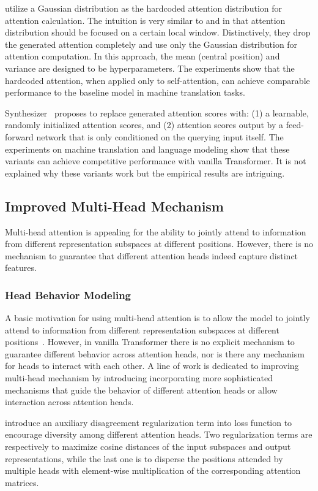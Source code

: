 \documentclass[manuscript,acmsmall,screen,nonacm]{acmart}
\theoremstyle{definition}
\begin{document}
\citet{you2020hardcoded} utilize a Gaussian distribution as the hardcoded attention distribution for attention calculation. The intuition is very similar to \citet{yang18localness} and \citet{guo19gaussian} in that attention distribution should be focused on a certain local window. Distinctively, they drop the generated attention completely and use only the Gaussian distribution for attention computation. In this approach, the mean (central position) and variance are designed to be hyperparameters. The experiments show that the hardcoded attention, when applied only to self-attention, can achieve comparable performance to the baseline model in machine translation tasks.

Synthesizer~\cite{synthesizer} proposes to replace generated attention scores with: (1) a learnable, randomly initialized attention scores, and (2) attention scores output by a feed-forward network that is only conditioned on the querying input itself. The experiments on machine translation and language modeling show that these variants can achieve competitive performance with vanilla Transformer. It is not explained why these variants work but the empirical results are intriguing.

\subsection{Improved Multi-Head Mechanism}
Multi-head attention is appealing for the ability to jointly attend to information from different representation subspaces at different positions. However, there is no mechanism to guarantee that different attention heads indeed capture
distinct features.

\subsubsection{Head Behavior Modeling}
A basic motivation for using multi-head attention is to allow the model to jointly attend to information from different representation subspaces at different positions~\cite{vaswani2017attention}. However, in vanilla Transformer there is no explicit mechanism to guarantee different behavior across attention heads, nor is there any mechanism for heads to interact with each other. A line of work is dedicated to improving multi-head mechanism by introducing incorporating more sophisticated mechanisms that guide the behavior of different attention heads or allow interaction across attention heads.

\citet{li18disagreementregu} introduce an auxiliary disagreement regularization term into loss function to encourage diversity among different attention heads. Two regularization terms are respectively to maximize cosine distances of the input subspaces and output representations, while the last one is to disperse
the positions attended by multiple heads with element-wise multiplication of the corresponding attention matrices.
\end{document}

